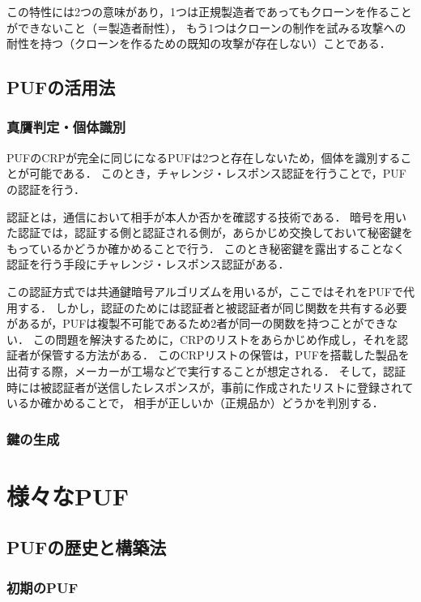 \documentclass[technicalreport]{ieicej} %
\begin{document}
この特性には2つの意味があり，1つは正規製造者であってもクローンを作ることができないこと（＝製造者耐性），
もう1つはクローンの制作を試みる攻撃への耐性を持つ（クローンを作るための既知の攻撃が存在しない）ことである．
\subsection{PUFの活用法}
\label{puf use}
\subsubsection{真贋判定・個体識別}
PUFのCRPが完全に同じになるPUFは2つと存在しないため，個体を識別することが可能である．
このとき，チャレンジ・レスポンス認証を行うことで，PUFの認証を行う．

認証とは，通信において相手が本人か否かを確認する技術である．
暗号を用いた認証では，認証する側と認証される側が，あらかじめ交換しておいて秘密鍵をもっているかどうか確かめることで行う．
このとき秘密鍵を露出することなく認証を行う手段にチャレンジ・レスポンス認証がある．

この認証方式では共通鍵暗号アルゴリズムを用いるが，ここではそれをPUFで代用する．
しかし，認証のためには認証者と被認証者が同じ関数を共有する必要があるが，PUFは複製不可能であるため2者が同一の関数を持つことができない．
この問題を解決するために，CRPのリストをあらかじめ作成し，それを認証者が保管する方法がある．
このCRPリストの保管は，PUFを搭載した製品を出荷する際，メーカーが工場などで実行することが想定される．
そして，認証時には被認証者が送信したレスポンスが，事前に作成されたリストに登録されているか確かめることで，
相手が正しいか（正規品か）どうかを判別する．
\subsubsection{鍵の生成}

\section{様々なPUF}
\label{pufhis}
\subsection{PUFの歴史と構築法}
\subsubsection{初期のPUF}
\label{firstpuf}
\end{document}

